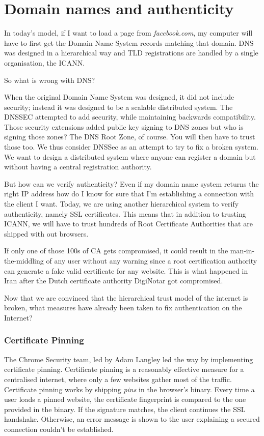\documentclass{vldb}
\begin{document}
\section{Domain names and authenticity}

In today's model, if I want to load a page from \emph{facebook.com}, my computer will have to first get the Domain Name System records matching that domain. DNS was designed in a hierarchical way and TLD registrations are handled by a single organisation, the ICANN.

So what is wrong with DNS?

When the original Domain Name System was designed, it did not include security; instead it was designed to be a scalable distributed system. The DNSSEC attempted to add security, while maintaining backwards compatibility. Those security extensions added public key signing to DNS zones but who is signing those zones? The DNS Root Zone, of course. You will then have to trust those too. We thus consider DNSSec as an attempt to try to fix a broken system. We want to design a distributed system where anyone can register a domain but without having a central registration authority.

But how can we verify authenticity? 
Even if my domain name system returns the right IP address how do I know for sure that I'm establishing a connection with the client I want. Today, we are using another hierarchical system to verify authenticity, namely SSL certificates. This means that in addition to trusting ICANN, we will have to trust hundreds of Root Certificate Authorities that are shipped with out browsers.\cite{mozillaSSL}

If only one of those 100s of CA gets compromised, it could result in the man-in-the-middling of any user without any warning since a root certification authority can generate a fake valid certificate for any website. This is what happened in Iran after the Dutch certificate authority DigiNotar got compromised\cite{diginotarHack}.

Now that we are convinced that the hierarchical trust model of the internet is broken, what measures have already been taken to fix authentication on the Internet?

\subsubsection{Certificate Pinning}

The Chrome Security team, led by Adam Langley led the way by implementing certificate pinning. Certificate pinning is a reasonably effective measure for a centralised internet, where only a few websites gather most of the traffic. Certificate pinning works by shipping \emph{pins} in the browser's binary.\cite{chromiumPins} Every time a user loads a pinned website, the certificate fingerprint is compared to the one provided in the binary. If the signature matches, the client continues the SSL handshake. Otherwise, an error message is shown to the user explaining a secured connection couldn't be established.
\end{document}
